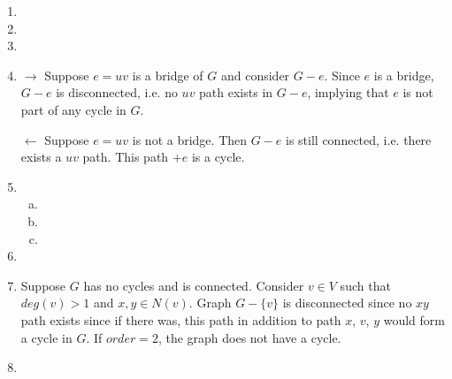 \documentclass[11pt]{article}
\begin{document}
\begin{enumerate}[1]
    \item %
        

    \item %

    \item %

    \item %
        $\rightarrow$ Suppose $e = uv$ is a bridge of $G$ and consider $G-e$. Since
        $e$ is a bridge, $G-e$ is disconnected, i.e. no $uv$ path exists in $G-e$,
        implying that $e$ is not part of any cycle in $G$. 


        $\leftarrow$ Suppose $e = uv$ is not a bridge. Then $G - e$ is still connected, 
        i.e. there exists a $uv$ path. This path $+ e$ is a cycle.

    \item %
        \begin{enumerate}[a)]
            \item 
            \item 
            \item
        \end{enumerate}

    \item %


    \item %
        Suppose $G$ has no cycles and is connected. Consider $v \in V$ such that 
        $deg(v) > 1$ and $x,y \in N(v)$. Graph $G - \{v\}$ is disconnected since 
        no $xy$ path exists since if there was, this path in addition to 
        path $x$, $v$, $y$ would form a cycle in $G$. If $order = 2$, the graph does 
        not have a cycle. 
    \item %


\end{enumerate}
\end{document}

